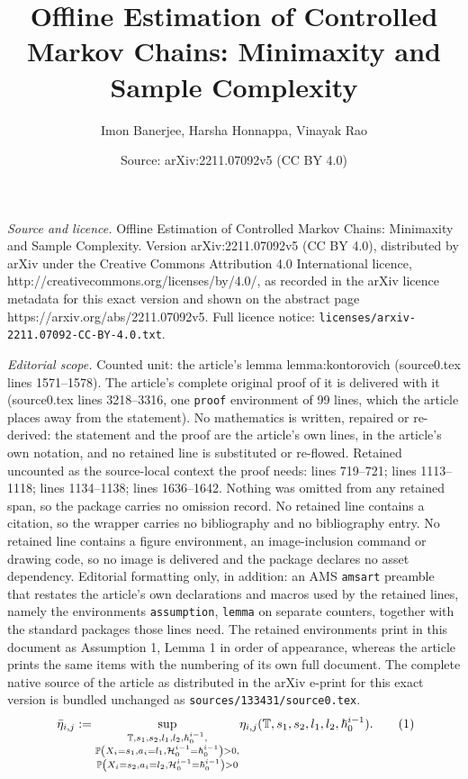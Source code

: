 \documentclass[10pt,a4paper]{amsart}
\title{Offline Estimation of Controlled Markov Chains: Minimaxity and Sample Complexity}
\author{Imon Banerjee, Harsha Honnappa, Vinayak Rao}
\date{Source: arXiv:2211.07092v5 (CC BY 4.0)}
\newcommand{\History}{\mathcal{H}}
\newcommand{\Pbb}{\mathbb{P}}
\newcommand{\history}{\hbar}
\newcommand{\lp}{\left(}
\newcommand\numberthis{\addtocounter{equation}{1}\tag{\theequation}}
\newcommand{\prob}{\Pbb}
\newcommand{\rp}{\right)}
\begin{document}
\maketitle

\noindent\emph{Source and licence.} Offline Estimation of Controlled Markov Chains: Minimaxity and Sample Complexity. Version arXiv:2211.07092v5 (CC BY 4.0), distributed by arXiv under the Creative Commons Attribution 4.0 International licence, http://creativecommons.org/licenses/by/4.0/, as recorded in the arXiv licence metadata for this exact version and shown on the abstract page https://arxiv.org/abs/2211.07092v5. Full licence notice: \texttt{licenses/arxiv-2211.07092-CC-BY-4.0.txt}.\par\smallskip

\noindent\textit{Editorial scope.} Counted unit: the article's lemma lemma:kontorovich (source0.tex lines 1571--1578). The article's complete original proof of it is delivered with it (source0.tex lines 3218--3316, one \texttt{proof} environment of 99 lines, which the article places away from the statement). No mathematics is written, repaired or re-derived: the statement and the proof are the article's own lines, in the article's own notation, and no retained line is substituted or re-flowed.  Retained uncounted as the source-local context the proof needs: lines 719--721; lines 1113--1118; lines 1134--1138; lines 1636--1642.  Nothing was omitted from any retained span, so the package carries no omission record.  No retained line contains a citation, so the wrapper carries no bibliography and no bibliography entry.  No retained line contains a figure environment, an image-inclusion command or drawing code, so no image is delivered and the package declares no asset dependency.  Editorial formatting only, in addition: an AMS \texttt{amsart} preamble that restates the article's own declarations and macros used by the retained lines, namely the environments \texttt{assumption}, \texttt{lemma} on separate counters, together with the standard packages those lines need.  The retained environments print in this document as Assumption 1, Lemma 1 in order of appearance, whereas the article prints the same items with the numbering of its own full document.  The complete native source of the article as distributed in the arXiv e-print for this exact version is bundled unchanged as \texttt{sources/133431/source0.tex}.
    \begin{align*}~\label{def:weak-mixing}
    \Bar{\eta}_{i,j}:= \underset{\color{black}\substack{\mathbb{T},s_1,s_2,l_1,l_2,\history_0^{i-1},\\\prob\lp X_i=s_1,a_i=l_1,\History_0^{i-1}=\history_0^{i-1}\rp>0,\\\prob\lp  X_i=s_2,a_i=l_2,\History_0^{i-1}=\history_0^{i-1}\rp>0}}{\sup} \eta_{i,j}(\mathbb{T},s_1,s_2,l_1,l_2,\history_0^{i-1}).\numberthis
\end{align*}
\end{document}
